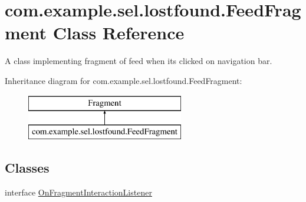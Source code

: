 \hypertarget{classcom_1_1example_1_1sel_1_1lostfound_1_1FeedFragment}{}\section{com.\+example.\+sel.\+lostfound.\+Feed\+Fragment Class Reference}
\label{classcom_1_1example_1_1sel_1_1lostfound_1_1FeedFragment}


A class implementing fragment of feed when its clicked on navigation bar.  


Inheritance diagram for com.\+example.\+sel.\+lostfound.\+Feed\+Fragment\+:\begin{figure}[H]
\begin{center}
\leavevmode
\includegraphics[height=2.000000cm]{classcom_1_1example_1_1sel_1_1lostfound_1_1FeedFragment}
\end{center}
\end{figure}
\subsection*{Classes}
\begin{DoxyCompactItemize}
\item 
interface \hyperlink{interfacecom_1_1example_1_1sel_1_1lostfound_1_1FeedFragment_1_1OnFragmentInteractionListener}{On\+Fragment\+Interaction\+Listener}
\end{DoxyCompactItemize}
